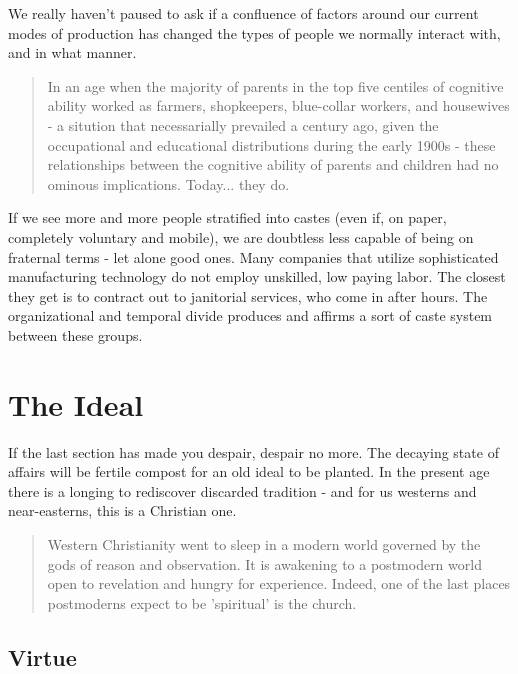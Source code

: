 \documentclass[letterpaper]{article}
\begin{document}
We really haven't paused to ask if a confluence of factors around our current modes of production has changed the types of people we normally interact with, and in what manner.

\begin{quote}
  In an age when the majority of parents in the top five centiles of cognitive ability worked as farmers, shopkeepers, blue-collar workers, and housewives - a sitution that necessarially prevailed a century ago, given the occupational and educational distributions during the early 1900s - these relationships between the cognitive ability of parents and children had no ominous implications. Today... they do.
\end{quote}

If we see more and more people stratified into castes (even if, on paper, completely voluntary and mobile), we are doubtless less capable of being on fraternal terms - let alone good ones. Many companies that utilize sophisticated manufacturing technology do not employ unskilled, low paying labor. The closest they get is to contract out to janitorial services, who come in after hours. The organizational and temporal divide produces and affirms a sort of caste system between these groups.

\section{The Ideal}

If the last section has made you despair, despair no more. The decaying state of affairs will be fertile compost for an old ideal to be planted. In the present age there is a longing to rediscover discarded tradition - and for us westerns and near-easterns, this is a Christian one.

\begin{quote}
  Western Christianity went to sleep in a modern world governed by the gods of reason and observation. It is awakening to a postmodern world open to revelation and hungry for experience. Indeed, one of the last places postmoderns expect to be 'spiritual' is the church.
\end{quote}

\subsection{Virtue}
\end{document}
